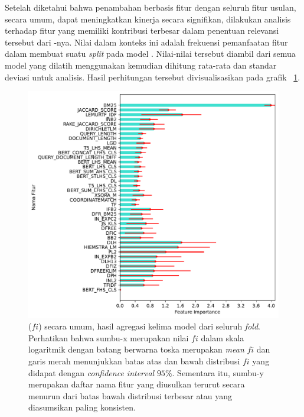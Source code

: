 Setelah diketahui bahwa penambahan \reranker{} berbasis fitur dengan seluruh fitur usulan, secara umum, dapat meningkatkan kinerja secara signifikan, dilakukan analisis terhadap fitur yang memiliki kontribusi terbesar dalam penentuan relevansi tersebut dari \feature{} \importance{}-nya. Nilai \feature{} \importance{} dalam konteks ini adalah frekuensi pemanfaatan fitur dalam membuat suatu \textit{split} pada model \lambdamart{}. Nilai-nilai tersebut diambil dari semua model \lambdamart{} yang dilatih menggunakan \fcv{} kemudian dihitung rata-rata dan standar deviasi untuk analisis. Hasil perhitungan tersebut divisualisasikan pada grafik \gambar{}~\ref{grafik:Feature Importance All}.
\begin{figure}[!ht]
    \centering
    \includegraphics[scale=0.725]{assets/pdfs/Feature Importance Distribution Log.pdf}
    \caption{\Feature{} \importance{} ($fi$) secara umum, hasil agregasi kelima model dari seluruh \textit{fold}. Perhatikan bahwa sumbu-x merupakan nilai $fi$ dalam skala logaritmik dengan batang berwarna toska merupakan \textit{mean} $fi$ dan garis merah menunjukkan batas atas dan bawah distribusi $fi$ yang didapat dengan \textit{confidence interval} $95\%$. Sementara itu, sumbu-y merupakan daftar nama fitur yang diusulkan terurut secara menurun dari batas bawah distribusi terbesar atau yang diasumsikan paling konsisten.}
    \label{grafik:Feature Importance All}
\end{figure}
